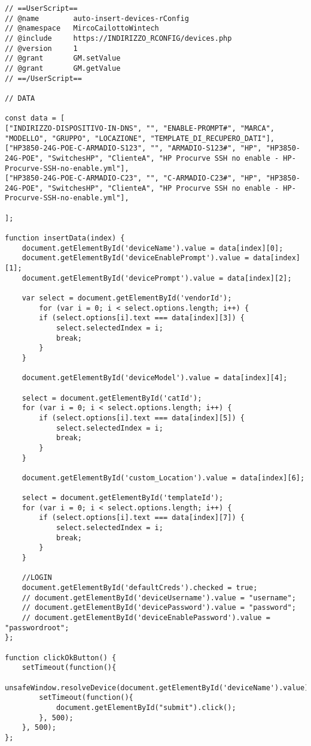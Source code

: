 \documentclass[Tesi.tex]{subfiles}
\begin{document}
\begin{lstlisting}[caption=My Javascript Example]
// ==UserScript==
// @name        auto-insert-devices-rConfig
// @namespace   MircoCailottoWintech
// @include     https://INDIRIZZO_RCONFIG/devices.php
// @version     1
// @grant       GM.setValue
// @grant       GM.getValue
// ==/UserScript==

// DATA

const data = [
["INDIRIZZO-DISPOSITIVO-IN-DNS", "", "ENABLE-PROMPT#", "MARCA", "MODELLO", "GRUPPO", "LOCAZIONE", "TEMPLATE_DI_RECUPERO_DATI"],
["HP3850-24G-POE-C-ARMADIO-S123", "", "ARMADIO-S123#", "HP", "HP3850-24G-POE", "SwitchesHP", "ClienteA", "HP Procurve SSH no enable - HP-Procurve-SSH-no-enable.yml"],
["HP3850-24G-POE-C-ARMADIO-C23", "", "C-ARMADIO-C23#", "HP", "HP3850-24G-POE", "SwitchesHP", "ClienteA", "HP Procurve SSH no enable - HP-Procurve-SSH-no-enable.yml"],

];

function insertData(index) {
	document.getElementById('deviceName').value = data[index][0];
	document.getElementById('deviceEnablePrompt').value = data[index][1];
	document.getElementById('devicePrompt').value = data[index][2];
	
	var select = document.getElementById('vendorId');
		for (var i = 0; i < select.options.length; i++) {
		if (select.options[i].text === data[index][3]) {
			select.selectedIndex = i;
			break;
		}
	}
	
	document.getElementById('deviceModel').value = data[index][4];
	
	select = document.getElementById('catId');
	for (var i = 0; i < select.options.length; i++) {
		if (select.options[i].text === data[index][5]) {
			select.selectedIndex = i;
			break;
		}
	}

	document.getElementById('custom_Location').value = data[index][6];

	select = document.getElementById('templateId');
	for (var i = 0; i < select.options.length; i++) {
		if (select.options[i].text === data[index][7]) {
			select.selectedIndex = i;
			break;
		}
	}
	
	//LOGIN
	document.getElementById('defaultCreds').checked = true;
	// document.getElementById('deviceUsername').value = "username";
	// document.getElementById('devicePassword').value = "password";
	// document.getElementById('deviceEnablePassword').value = "passwordroot";
};

function clickOkButton() {
	setTimeout(function(){
		unsafeWindow.resolveDevice(document.getElementById('deviceName').value);
		setTimeout(function(){
			document.getElementById("submit").click();
		}, 500);
	}, 500);
};


\end{lstlisting}
\end{document}
